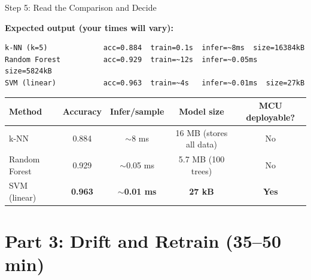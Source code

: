 \documentclass[aspectratio=169,11pt]{beamer}
\begin{document}
\begin{frame}[fragile,shrink=10]{Step 5: Read the Comparison and Decide}

    \vspace{0.2cm}
    \textbf{Expected output (your times will vary):}
\begin{lstlisting}
k-NN (k=5)             acc=0.884  train=0.1s  infer=~8ms  size=16384kB
Random Forest          acc=0.929  train=~12s  infer=~0.05ms  size=5824kB
SVM (linear)           acc=0.963  train=~4s   infer=~0.01ms  size=27kB
\end{lstlisting}

    \vspace{0.15cm}
    \begin{center}
    \footnotesize
    \begin{tabular}{lcccc}
        \toprule
        \textbf{Method} & \textbf{Accuracy} & \textbf{Infer/sample} & \textbf{Model size} & \textbf{MCU deployable?} \\
        \midrule
        k-NN           & 0.884 & $\sim$8 ms & 16 MB (stores all data)  & No \\
        Random Forest  & 0.929 & $\sim$0.05 ms & 5.7 MB (100 trees) & No \\
        SVM (linear)   & \textbf{0.963} & \textbf{$\sim$0.01 ms} & \textbf{27 kB} & \textbf{Yes} \\
        \bottomrule
    \end{tabular}
    \normalsize
    \end{center}

\end{frame}

\section{Part 3: Drift and Retrain (35--50 min)}
\end{document}
